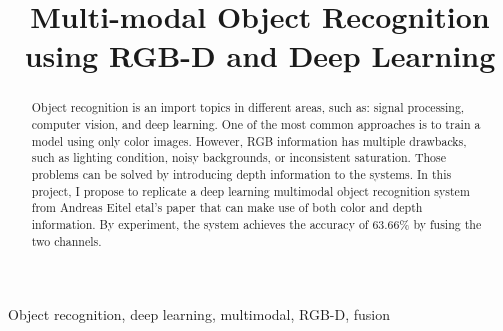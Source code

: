 \documentclass{article}
\title{Multi-modal Object Recognition using RGB-D and Deep Learning}
\begin{document}
%
\maketitle
%
\begin{abstract}
Object recognition is an import topics in different areas, such as: signal processing, computer vision, and deep learning. One of the most common approaches is to train a model using only color images. However, RGB information has multiple drawbacks, such as lighting condition, noisy backgrounds, or inconsistent saturation. Those problems can be solved by introducing depth information to the systems. In this project, I propose to replicate a deep learning multimodal object recognition system from Andreas Eitel etal's paper that can make use of both color and depth information. By experiment, the system achieves the accuracy of 63.66\% by fusing the two channels.
\end{abstract}
%
\begin{keywords}
Object recognition, deep learning, multimodal, RGB-D, fusion
\end{keywords}
%









\end{document}

